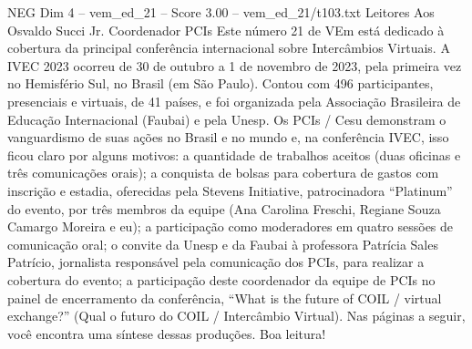 \begin{textsample}{NEG Dim 4 – vem\_ed\_21 – Score 3.00 – vem\_ed\_21/t103.txt}  \label{ex:f4_neg_071}
Leitores Aos Osvaldo Succi Jr.
Coordenador PCIs Este número 21 de VEm está dedicado à cobertura da principal conferência internacional sobre Intercâmbios Virtuais.
A IVEC 2023 ocorreu de 30 de outubro a 1 de novembro de 2023, pela primeira vez no Hemisfério Sul, no Brasil (em São Paulo).
Contou com 496 participantes, presenciais e virtuais, de 41 países, e foi organizada pela Associação Brasileira de Educação Internacional (Faubai) e pela Unesp.
Os PCIs / Cesu demonstram o vanguardismo de suas ações no Brasil e no mundo e, na conferência IVEC, isso ficou claro por alguns motivos: a quantidade de trabalhos aceitos (duas oficinas e três comunicações orais); a conquista de bolsas para cobertura de gastos com inscrição e estadia, oferecidas pela Stevens Initiative, patrocinadora “Platinum” do evento, por três membros da equipe (Ana Carolina Freschi, Regiane Souza Camargo Moreira e eu); a participação como moderadores em quatro sessões de comunicação oral; o convite da Unesp e da Faubai à professora Patrícia Sales Patrício, jornalista responsável pela comunicação dos PCIs, para realizar a cobertura do evento; a participação deste coordenador da equipe de PCIs no painel de encerramento da conferência, “What is the future of COIL / virtual exchange?” (Qual o futuro do COIL / Intercâmbio Virtual).
Nas páginas a seguir, você encontra uma síntese dessas produções.
Boa leitura!

\end{textsample}
